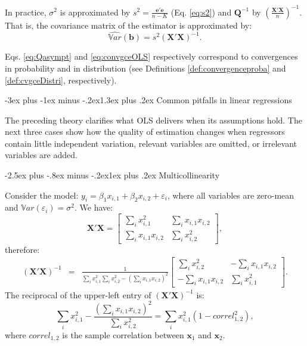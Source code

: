 \documentclass[
  11pt,
]{book}
\makeatletter
\renewcommand\section{\@startsection{section}{1}{\z@}
  {-3ex plus -1ex minus -.2ex}{1.3ex plus .2ex}
  {\normalfont\Large\bfseries\color{TextbookInk}}}
\renewcommand\subsection{\@startsection{subsection}{2}{\z@}
  {-2.5ex plus -.8ex minus -.2ex}{1ex plus .2ex}
  {\normalfont\large\bfseries\color{TextbookInk}}}
\theoremstyle{definition}
\theoremstyle{definition}
\theoremstyle{definition}
\theoremstyle{definition}
\theoremstyle{remark}
\makeatother
\begin{document}
In practice, \(\sigma^2\) is approximated by \(s^2=\frac{\mathbf{e}'\mathbf{e}}{n-K}\) (Eq. \eqref{eq:s2}) and \(\mathbf{Q}^{-1}\) by \(\left(\frac{\mathbf{X}'\mathbf{X}}{n}\right)^{-1}\). That is, the covariance matrix of the estimator is approximated by:
\begin{equation}
\boxed{\widehat{\mathbb{V}ar}(\mathbf{b}) = s^2 (\mathbf{X}'\mathbf{X})^{-1}.}\label{eq:sXX}
\end{equation}

Eqs. \eqref{eq:Qasympt} and \eqref{eq:convgceOLS} respectively correspond to convergences in probability and in distribution (see Definitions \ref{def:convergenceproba} and \ref{def:cvgceDistri}, respectively).

\section{Common pitfalls in linear regressions}\label{CommonPitfalls}

The preceding theory clarifies what OLS delivers when its assumptions hold. The next three cases show how the quality of estimation changes when regressors contain little independent variation, relevant variables are omitted, or irrelevant variables are added.

\subsection{Multicollinearity}\label{multicollinearity}

Consider the model: \(y_i = \beta_1 x_{i,1} + \beta_2 x_{i,2} + \varepsilon_i\), where all variables are zero-mean and \(\mathbb{V}ar(\varepsilon_i)=\sigma^2\). We have:
\[
\mathbf{X}'\mathbf{X} = \left[ \begin{array}{cc}
\sum_i x_{i,1}^2 & \sum_i x_{i,1} x_{i,2} \\
\sum_i x_{i,1} x_{i,2} & \sum_i x_{i,2}^2
\end{array}\right],
\]
therefore:
\begin{eqnarray*}
(\mathbf{X}'\mathbf{X})^{-1} &=& \frac{1}{\sum_i x_{i,1}^2\sum_i x_{i,2}^2 - (\sum_i x_{i,1} x_{i,2})^2} \left[ \begin{array}{cc}
\sum_i x_{i,2}^2 & -\sum_i x_{i,1} x_{i,2} \\
-\sum_i x_{i,1} x_{i,2} & \sum_i x_{i,1}^2
\end{array}\right].
\end{eqnarray*}
The reciprocal of the upper-left entry of \((\mathbf{X}'\mathbf{X})^{-1}\) is:
\begin{equation}
\sum_i x_{i,1}^2 - \frac{(\sum_i x_{i,1} x_{i,2})^2}{\sum_i x_{i,2}^2} = \sum_i x_{i,1}^2(1 - correl_{1,2}^2),\label{eq:multicollin}
\end{equation}
where \(correl_{1,2}\) is the sample correlation between \(\mathbf{x}_{1}\) and \(\mathbf{x}_{2}\).
\end{document}
